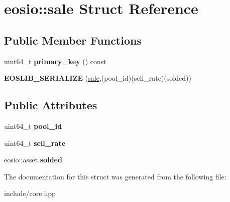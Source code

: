\hypertarget{structeosio_1_1sale}{}\section{eosio\+:\+:sale Struct Reference}
\label{structeosio_1_1sale}
\subsection*{Public Member Functions}
\begin{DoxyCompactItemize}
\item 
\mbox{\label{structeosio_1_1sale_a0e021a885fdba1cacd9ad0fbe831c072}} 
uint64\+\_\+t {\bfseries primary\+\_\+key} () const
\item 
\mbox{\label{structeosio_1_1sale_a688fc4f02aa06e949247f3ae88e8bd9a}} 
{\bfseries E\+O\+S\+L\+I\+B\+\_\+\+S\+E\+R\+I\+A\+L\+I\+ZE} (\mbox{\hyperlink{structeosio_1_1sale}{sale}},(pool\+\_\+id)(sell\+\_\+rate)(solded))
\end{DoxyCompactItemize}
\subsection*{Public Attributes}
\begin{DoxyCompactItemize}
\item 
\mbox{\label{structeosio_1_1sale_a9fae85285c4056b4bdb9f282dfec2dd2}} 
uint64\+\_\+t {\bfseries pool\+\_\+id}
\item 
\mbox{\label{structeosio_1_1sale_aa6b2bef57485184fbb119544e82306d1}} 
uint64\+\_\+t {\bfseries sell\+\_\+rate}
\item 
\mbox{\label{structeosio_1_1sale_ac830e7ba10f21b886bb4637db2f738e1}} 
eosio\+::asset {\bfseries solded}
\end{DoxyCompactItemize}


The documentation for this struct was generated from the following file\+:\begin{DoxyCompactItemize}
\item 
include/core.\+hpp\end{DoxyCompactItemize}
